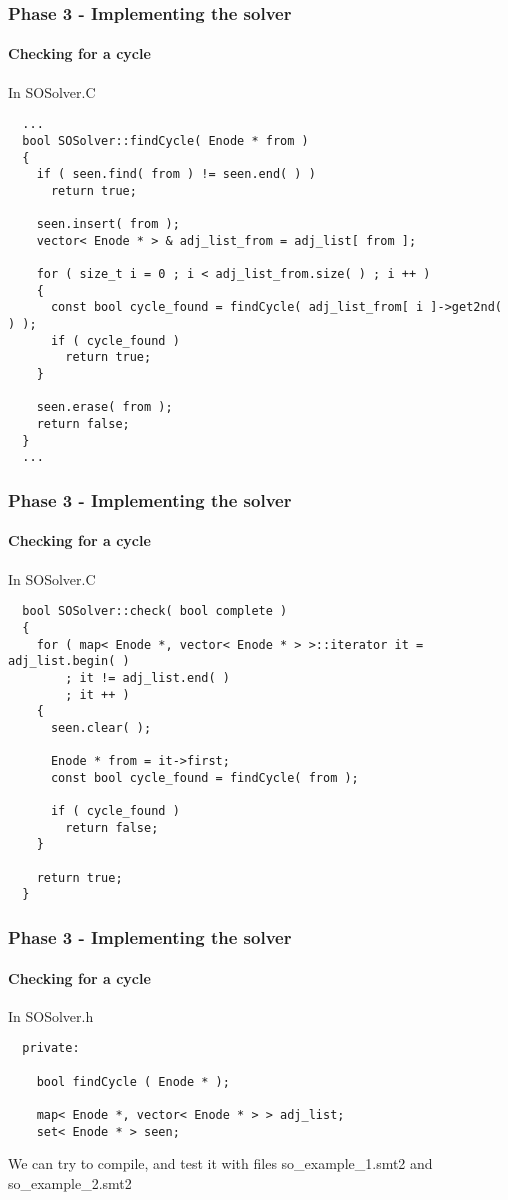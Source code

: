 \begin{frame}[fragile]
  \frametitle{Phase 3 - Implementing the solver}
  \framesubtitle{Checking for a cycle}

  \scriptsize

  In SOSolver.C

  \begin{verbatim}
  ...
  bool SOSolver::findCycle( Enode * from )
  {
    if ( seen.find( from ) != seen.end( ) )
      return true;
    
    seen.insert( from );
    vector< Enode * > & adj_list_from = adj_list[ from ];
    
    for ( size_t i = 0 ; i < adj_list_from.size( ) ; i ++ )
    {
      const bool cycle_found = findCycle( adj_list_from[ i ]->get2nd( ) );
      if ( cycle_found ) 
        return true;
    }
    
    seen.erase( from );
    return false;
  }
  ...
  \end{verbatim}

\end{frame}

\begin{frame}[fragile]
  \frametitle{Phase 3 - Implementing the solver}
  \framesubtitle{Checking for a cycle}

  \scriptsize

  In SOSolver.C

  \begin{verbatim}
  bool SOSolver::check( bool complete )    
  { 
    for ( map< Enode *, vector< Enode * > >::iterator it = adj_list.begin( )
        ; it != adj_list.end( )
        ; it ++ )
    {
      seen.clear( );
    
      Enode * from = it->first;
      const bool cycle_found = findCycle( from ); 
    
      if ( cycle_found )
        return false;
    }
    
    return true;
  }
  \end{verbatim}

\end{frame}

\begin{frame}[fragile]
  \frametitle{Phase 3 - Implementing the solver}
  \framesubtitle{Checking for a cycle}

  In SOSolver.h

  \begin{verbatim}
  private:

    bool findCycle ( Enode * );
   
    map< Enode *, vector< Enode * > > adj_list;
    set< Enode * > seen;
  \end{verbatim}

  We can try to compile, and test it with files 
  so\_example\_1.smt2 and so\_example\_2.smt2

\end{frame}


